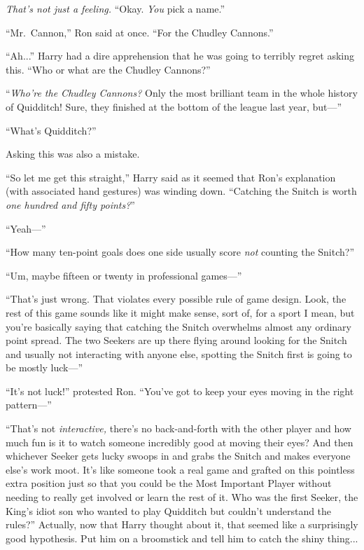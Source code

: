 \emph{That’s not just a feeling.} “Okay. \emph{You} pick a name.”

“Mr.~Cannon,” Ron said at once. “For the Chudley Cannons.”

“Ah...” Harry had a dire apprehension that he was going to terribly regret asking this. “Who or what are the Chudley Cannons?”

“\emph{Who’re the Chudley Cannons?} Only the most brilliant team in the whole history of Quidditch! Sure, they finished at the bottom of the league last year, but—”

“What’s Quidditch?”

Asking this was also a mistake.

“So let me get this straight,” Harry said as it seemed that Ron’s explanation (with associated hand gestures) was winding down. “Catching the Snitch is worth \emph{one hundred and fifty points?}”

“Yeah—”

“How many ten-point goals does one side usually score \emph{not} counting the Snitch?”

“Um, maybe fifteen or twenty in professional games—”

“That’s just wrong. That violates every possible rule of game design. Look, the rest of this game sounds like it might make sense, sort of, for a sport I mean, but you’re basically saying that catching the Snitch overwhelms almost any ordinary point spread. The two Seekers are up there flying around looking for the Snitch and usually not interacting with anyone else, spotting the Snitch first is going to be mostly luck—”

“It’s not luck!” protested Ron. “You’ve got to keep your eyes moving in the right pattern—”

\sloppypar “That’s not \emph{interactive,} there’s no back-and-forth with the other player and how much fun is it to watch someone incredibly good at moving their eyes? And then whichever Seeker gets lucky swoops in and grabs the Snitch and makes everyone else’s work moot. It’s like someone took a real game and grafted on this pointless extra position just so that you could be the Most Important Player without needing to really get involved or learn the rest of it. Who was the first Seeker, the King’s idiot son who wanted to play Quidditch but couldn’t understand the rules?” Actually, now that Harry thought about it, that seemed like a surprisingly good hypothesis. Put him on a broomstick and tell him to catch the shiny thing...

